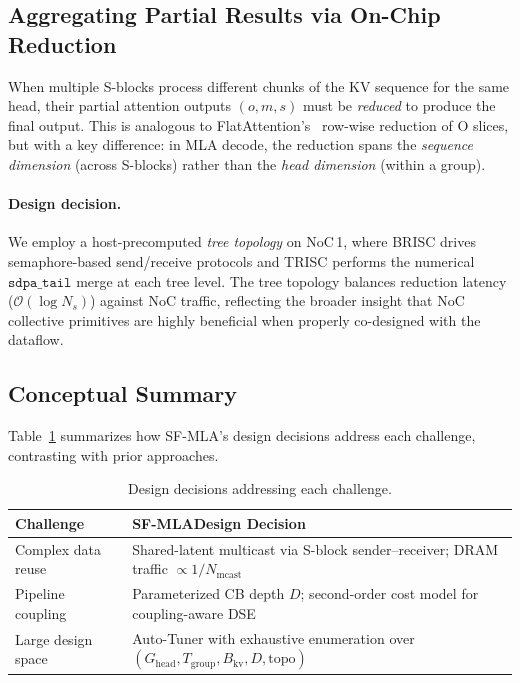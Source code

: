 \documentclass[sigconf, review, anonymous]{acmart}
\newcommand{\brand}{SF-MLA}
\newcommand{\sysname}{\textsc{\brand}\xspace}
\newcommand{\SblockName}{S-block}
\newcommand{\SblockNames}{S-blocks}
\newcommand{\SharedLatentMulticast}{Shared-latent multicast}
\newcommand{\AutoTuner}{Auto-Tuner}
\newcommand{\Bkv}{B_{\mathrm{kv}}}
\newcommand{\Ghead}{G_{\mathrm{head}}}
\newcommand{\Tgroup}{T_{\mathrm{group}}}
\begin{document}

\subsection{Aggregating Partial Results via On-Chip Reduction}\label{sec:concept-reduce}


When multiple \SblockNames{} process different chunks of the KV sequence for
the same head, their partial attention outputs $(o, m, s)$ must be
\emph{reduced} to produce the final output.  This is analogous to
FlatAttention's~\cite{flatattention2024} row-wise reduction of O
slices, but with a key difference: in MLA decode, the reduction spans
the \emph{sequence dimension} (across \SblockNames{}) rather than the
\emph{head dimension} (within a group).

\paragraph{Design decision.}
We employ a host-precomputed \emph{tree topology} on NoC\,1, where
BRISC drives semaphore-based send/receive protocols and TRISC
performs the numerical $\texttt{sdpa\_tail}$ merge at each tree level.
The tree topology balances reduction latency ($\mathcal{O}(\log N_s)$)
against NoC traffic, reflecting the broader insight that NoC
collective primitives are highly beneficial when properly co-designed
with the dataflow.



\subsection{Conceptual Summary}\label{sec:concept-summary}

Table~\ref{tab:concept-compare} summarizes how \sysname's design
decisions address each challenge, contrasting with prior approaches.

\begin{table}[t]
  \caption{Design decisions addressing each challenge.}
  \label{tab:concept-compare}
  \centering\small
  \begin{tabular}{lp{5.5cm}}
    \toprule
    \textbf{Challenge} & \textbf{\brand Design Decision} \\
    \midrule
    Complex data reuse &
      \SharedLatentMulticast{} via \SblockName{} sender--receiver;
      DRAM traffic $\propto 1/N_{\text{mcast}}$ \\
    Pipeline coupling &
      Parameterized CB depth $D$; second-order cost model
      for coupling-aware DSE \\
    Large design space &
      \AutoTuner{} with exhaustive enumeration over
      $(\Ghead, \Tgroup, \Bkv, D, \text{topo})$ \\
    \bottomrule
  \end{tabular}
\end{table}
\end{document}

